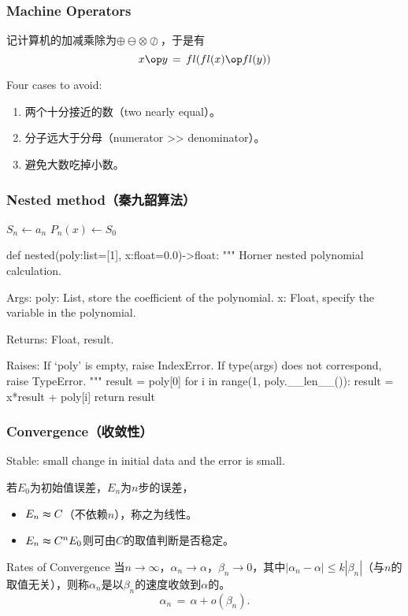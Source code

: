 \subsubsection{Machine Operators}
记计算机的加减乘除为$\oplus\ominus\otimes\oslash$，于是有
$$x\op y\,=\,fl(fl(x)\op fl(y))$$\par
Four cases to avoid:
\begin{enumerate}
    \item 两个十分接近的数（two nearly equal）。
    \item 分子远大于分母（numerator >> denominator）。
    \item 避免大数吃掉小数。
\end{enumerate}

\subsubsection{Nested method（秦九韶算法）}
\IncMargin{1em}
\begin{algorithm}
\BlankLine
    $S_n\leftarrow a_n$\;
    $P_n(x)\leftarrow S_0$\;
\end{algorithm}
\begin{python}
def nested(poly:list=[1], x:float=0.0)->float:
    """
    Horner nested polynomial calculation.

    Args:
        poly: List, store the coefficient of the polynomial.
        x: Float, specify the variable in the polynomial.

    Returns:
        Float, result.

    Raises:
        If `poly' is empty, raise IndexError.
        If type(args) does not correspond, raise TypeError.
    """
    result = poly[0]
    for i in range(1, poly.__len__()):
        result = x*result + poly[i]
    return result
\end{python}

\subsubsection{Convergence（收敛性）}
Stable: small change in initial data and the error is small.\par
若$E_0$为初始值误差，$E_n$为$n$步的误差，
\begin{itemize}
    \item $E_n\thickapprox C$（不依赖$n$），称之为线性。
    \item $E_n\thickapprox C^nE_0$则可由$C$的取值判断是否稳定。
\end{itemize}
\begin{defn}{Rates of Convergence}
当$n\rightarrow\infty$，$\alpha_n\rightarrow\alpha$，$\beta_n\rightarrow 0$，其中$\left|\alpha_n-\alpha\right|\leq k\left|\beta_n\right|$（与$n$的取值无关），则称$\alpha_n$是以$\beta_n$的速度收敛到$\alpha$的。
\[
\alpha_n\,=\,\alpha+o(\beta_n).
\]
\end{defn}
